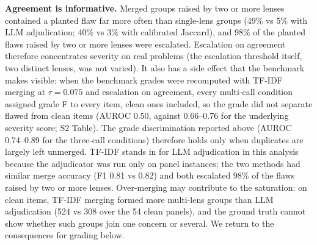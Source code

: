 \textbf{Agreement is informative.} Merged groups raised by two or more lenses contained a planted flaw far more often than single-lens groups (49\% vs 5\% with LLM adjudication; 40\% vs 3\% with calibrated Jaccard), and 98\% of the planted flaws raised by two or more lenses were escalated. Escalation on agreement therefore concentrates severity on real problems (the escalation threshold itself, two distinct lenses, was not varied). It also has a side effect that the benchmark makes visible: when the benchmark grades were recomputed with TF-IDF merging at $\tau=0.075$ and escalation on agreement, every multi-call condition assigned grade F to every item, clean ones included, so the grade did not separate flawed from clean items (AUROC 0.50, against 0.66--0.76 for the underlying severity score; S2 Table). The grade discrimination reported above (AUROC 0.74--0.89 for the three-call conditions) therefore holds only when duplicates are largely left unmerged. TF-IDF stands in for LLM adjudication in this analysis because the adjudicator was run only on panel instances; the two methods had similar merge accuracy (F1 0.81 vs 0.82) and both escalated 98\% of the flaws raised by two or more lenses. Over-merging may contribute to the saturation: on clean items, TF-IDF merging formed more multi-lens groups than LLM adjudication (524 vs 308 over the 54 clean panels), and the ground truth cannot show whether such groups join one concern or several. We return to the consequences for grading below.
